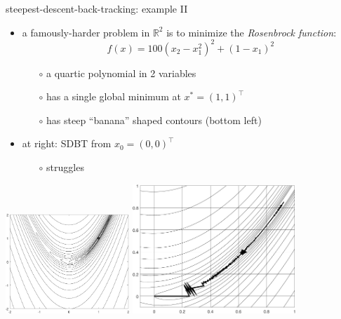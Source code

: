 \documentclass[10pt,hyperref]{beamer}
\newcommand{\RR}{\mathbb{R}}
\begin{document}
\begin{frame}{steepest-descent-back-tracking: example II}

\begin{itemize}
\item a famously-harder problem in $\RR^2$ is to minimize the \emph{Rosenbrock function}:
    $$f(x) = 100 (x_2 - x_1^2)^2 + (1 - x_1)^2$$
    \begin{itemize}
    \vspace{-4mm}
    \item[$\circ$] a quartic polynomial in 2 variables
    \item[$\circ$] has a single global minimum at $x^*=(1,1)^\top$
    \item[$\circ$] has steep ``banana'' shaped contours (bottom left)
    \end{itemize}

\smallskip
\item at right: SDBT from $x_0=(0,0)^\top$
    \begin{itemize}
    \item[$\circ$] struggles
    \end{itemize}
\end{itemize}

\vspace{-8mm}

\hspace{0.3in}
\includegraphics[width=0.35\textwidth,keepaspectratio=true]{figs/rosencontour}
\hspace{0.3in}
\includegraphics[width=0.46\textwidth,keepaspectratio=true]{figs/sdrosenslow}
\end{frame}
\end{document}
